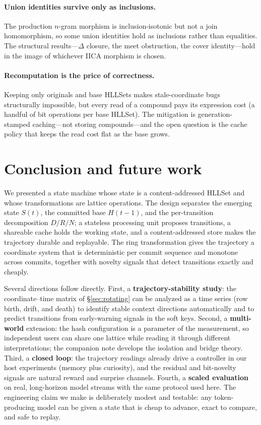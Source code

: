 \documentclass[11pt,a4paper]{article}
\theoremstyle{remark}
\newcommand{\xor}{\ensuremath{\Delta}}                %
\begin{document}
\paragraph{Union identities survive only as inclusions.} The production
$n$-gram morphism is inclusion-isotonic but not a join homomorphism, so some
union identities hold as inclusions rather than equalities. The structural
results---$\xor$ closure, the meet obstruction, the cover identity---hold in the
image of whichever IICA morphism is chosen.

\paragraph{Recomputation is the price of correctness.} Keeping only originals
and base HLLSets makes stale-coordinate bugs structurally impossible, but
every read of a compound pays its expression cost (a handful of bit operations
per base HLLSet). The mitigation is generation-stamped caching---not storing
compounds---and the open question is the cache policy that keeps the read cost
flat as the base grows.

\section{Conclusion and future work}
\label{sec:conclusion}

We presented a state machine whose state is a content-addressed HLLSet and whose
transformations are lattice operations. The design separates the emerging state
$S(t)$, the committed base $H(t{-}1)$, and the per-transition decomposition
$D/R/N$; a stateless processing unit proposes transitions, a shareable cache
holds the working state, and a content-addressed store makes the trajectory
durable and replayable. The ring transformation gives the trajectory a
coordinate system that is deterministic per commit sequence and monotone
across commits, together with novelty signals that detect transitions exactly
and cheaply.

Several directions follow directly. First, a \textbf{trajectory-stability
study}: the coordinate--time matrix of \S\ref{sec:rotating} can be analyzed as
a time series (row birth, drift, and death) to identify stable context
directions automatically and to predict transitions from early-warning signals
in the soft keys. Second, a
\textbf{multi-world} extension: the hash configuration is a parameter of the
measurement, so independent users can share one lattice while reading it through
different interpretations; the companion note develops the isolation and bridge
theory. Third, a \textbf{closed loop}: the trajectory readings already drive a
controller in our host experiments (memory plus curiosity), and the residual and
bit-novelty signals are natural reward and surprise channels. Fourth, a
\textbf{scaled evaluation} on real, long-horizon model streams with the same
protocol used here. The engineering claim we make is deliberately modest and
testable: any token-producing model can be given a state that is cheap to
advance, exact to compare, and safe to replay.
\end{document}
